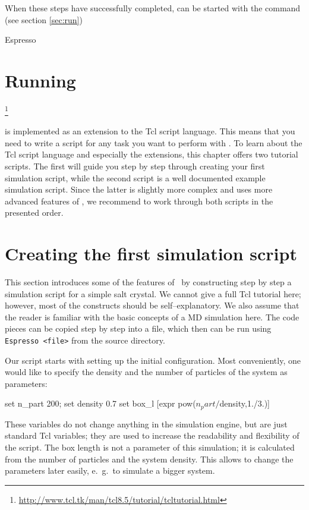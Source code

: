 When these steps have successfully completed, \es{} can be started
with the command (see section \vref{sec:run})
\begin{code}
Espresso
\end{code}

\section{Running \es}

\footnote{\url{http://www.tcl.tk/man/tcl8.5/tutorial/tcltutorial.html}}

\es{} is implemented as an extension to the Tcl script language. This means that you need to write a
script for any task you want to perform with \es. To learn about the Tcl script language and
especially the \es{} extensions, this chapter offers two tutorial scripts. The first will guide you
step by step through creating your first simulation script, while the second script is a well
documented example simulation script. Since the latter is slightly more complex and uses more
advanced features of \es{}, we recommend to work through both scripts in the presented order.

\section{Creating the first simulation script}

This section introduces some of the features of \es\ by
constructing step by step a simulation script for a simple salt crystal.
We cannot give a full Tcl tutorial here; however, most of the constructs
should be self--explanatory. We also assume that the reader is familiar with the
basic concepts of a MD simulation here. The code pieces can be copied step by
step into a file, which then can be run using \verb|Espresso <file>| from the
\es source directory.

Our script starts with setting up the initial configuration.  Most conveniently,
one would like to specify the density and the number of particles of the system
as parameters:
\begin{tclcode}
set n_part 200; set density 0.7
set box_l [expr pow($n_part/$density,1./3.)]
\end{tclcode}
These variables do not change anything in the simulation engine, but are just
standard Tcl variables; they are used to increase the readability and
flexibility of the script. The box length is not a parameter of this simulation;
it is calculated from the number of particles and the system density. This
allows to change the parameters later easily, e.~g.\ to simulate a bigger
system.

